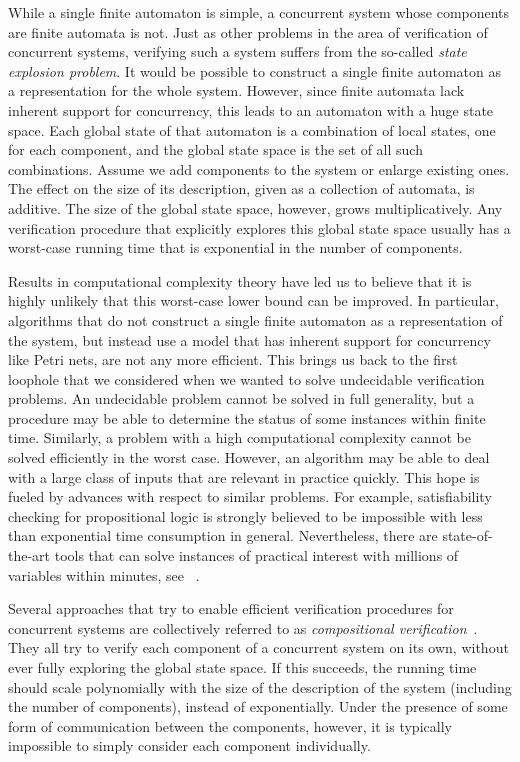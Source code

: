 \documentclass[../../diss.tex]{subfiles}
\begin{document}
While a single finite automaton is simple, a concurrent system whose components are finite automata is not.
Just as other problems in the area of verification of concurrent systems, verifying such a system suffers from the so-called \emph{state explosion problem}.
It would be possible to construct a single finite automaton as a representation for the whole system.
However, since finite automata lack inherent support for concurrency, this leads to an automaton with a huge state space.
Each global state of that automaton is a combination of local states, one for each component, and the global state space is the set of all such combinations.
Assume we add components to the system or enlarge existing ones.
The effect on the size of its description, given as a collection of automata, is additive.
The size of the global state space, however, grows multiplicatively.
Any verification procedure that explicitly explores this global state space usually has a worst-case running time that is exponential in the number of components.

Results in computational complexity theory have led us to believe that it is highly unlikely that this worst-case lower bound can be improved.
In particular, algorithms that do not construct a single finite automaton as a representation of the system, but instead use a model that has inherent support for concurrency like Petri nets, are not any more efficient.
This brings us back to the first loophole that we considered when we wanted to solve undecidable verification problems.
An undecidable problem cannot be solved in full generality, but a procedure may be able to determine the status of some instances within finite time.
Similarly, a problem with a high computational complexity cannot be solved efficiently in the worst case.
However, an algorithm may be able to deal with a large class of inputs that are relevant in practice quickly.
This hope is fueled by advances with respect to similar problems.
For example, satisfiability checking for propositional logic is strongly believed to be impossible with less than exponential time consumption in general.
Nevertheless, there are state-of-the-art tools that can solve instances of practical interest with millions of variables within minutes, see \eg~\cite{LiFLMLL18}.

Several approaches that try to enable efficient verification procedures for concurrent systems are collectively referred to as \emph{compositional verification}~\cite{OwickiG76,Lamport77,MisraC81,Pnueli84}.
They all try to verify each component of a concurrent system on its own, without ever fully exploring the global state space.
If this succeeds, the running time should scale polynomially with the size of the description of the system (including the number of components), instead of exponentially.
Under the presence of some form of communication between the components, however, it is typically impossible to simply consider each component individually.
\end{document}
